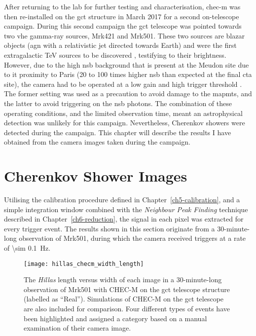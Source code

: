 After returning to the lab for further testing and characterisation, \gls{chec-m} was then re-installed on the \gls{gct} structure in March 2017 for a second on-telescope campaign. During this second campaign the \gls{gct} telescope was pointed towards two \gls{vhe} gamma-ray sources, Mrk421 and Mrk501. These two sources are blazar objects (\gls{agn} with a relativistic jet directed towards Earth) and were the first extragalactic \si{TeV} sources to be discovered \cite{Punch1992, Quinn1996} , testifying to their brightness. However, due to the high \gls{nsb} background that is present at the Meudon site due to it proximity to Paris (20 to 100 times higher \gls{nsb} than expected at the final \gls{cta} site), the camera had to be operated at a low gain and high trigger threshold \cite{Zorn2017}. The former setting was used as a precaution to avoid damage to the \glspl{mapmt}, and the latter to avoid triggering on the \gls{nsb} photons. The combination of these operating conditions, and the limited observation time, meant an astrophysical detection was unlikely for this campaign. Nevertheless, Cherenkov showers were detected during the campaign. This chapter will describe the results I have obtained from the camera images taken during the campaign.

\section{Cherenkov Shower Images}

Utilising the calibration procedure defined in Chapter~\ref{ch5-calibration}, and a simple integration window combined with the \textit{Neighbour Peak Finding} technique described in Chapter~\ref{ch6-reduction}, the signal in each pixel was extracted for every trigger event. The results shown in this section originate from a 30-minute-long observation of Mrk501, during which the camera received triggers at a rate of \SI{\sim 0.1}{Hz}.

\begin{figure}
  \centering
  \texttt{[image: hillas\_checm\_width\_length]}
  \caption[\textit{Hillas} length versus width for an on-sky observation run with CHEC-M.]{The \textit{Hillas} length versus width of each image in a 30-minute-long observation of Mrk501 with CHEC-M on the \gls{gct} telescope structure (labelled as ``Real''). Simulations of CHEC-M on the \gls{gct} telescope are also included for comparison. Four different types of events have been highlighted and assigned a category based on a manual examination of their camera image.}
  \label{fig:hillas_checm_width_length}
\end{figure}

